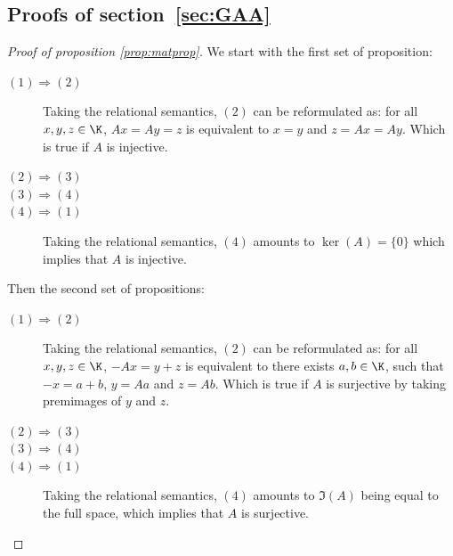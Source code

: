\subsection{Proofs of section~\ref{sec:GAA}}
\begin{proof}[Proof of proposition \ref{prop:matprop}]
  
  We start with the first set of proposition:
  
  \begin{description}
    \item[$(1)\Rightarrow (2)$] Taking the relational semantics, $(2)$ can be reformulated as: for all $x,y,z\in \K$, $Ax=Ay=z$ is equivalent to $x=y$ and $z=Ax=Ay$. Which is true if $A$ is injective.
    \item[$(2)\Rightarrow (3)$] 
    \item[$(3)\Rightarrow (4)$]
    \item[$(4)\Rightarrow (1)$] Taking the relational semantics, $(4)$ amounts to $\ker(A) = \{0\}$ which implies that $A$ is injective.
  \end{description}
  
  Then the second set of propositions:
  
  \begin{description}
    \item[$(1)\Rightarrow (2)$] Taking the relational semantics, $(2)$ can be reformulated as: for all $x,y,z\in \K$, $-Ax=y+z$ is equivalent to there exists $a,b\in\K$, such that $-x=a+b$, $y=Aa$ and $z=Ab$. Which is true if $A$ is surjective by taking premimages of $y$ and $z$.
    \item[$(2)\Rightarrow (3)$]
    \item[$(3)\Rightarrow (4)$]
    \item[$(4)\Rightarrow (1)$] Taking the relational semantics, $(4)$ amounts to $\Im(A)$ being equal to the full space, which implies that $A$ is surjective.
  \end{description}
  
\end{proof}
